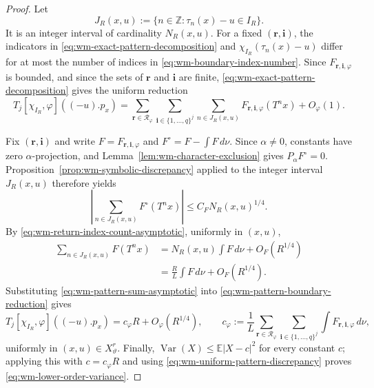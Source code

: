 \documentclass[11pt,reqno,a4paper]{amsart}
\numberwithin{equation}{section}
\theoremstyle{compact}
\theoremstyle{definition}
\theoremstyle{definition}
\newcommand{\Var}{\operatorname{Var}}
\begin{document}
\begin{proof}
Let
\begin{equation}\label{eq:wm-return-index-set}
  J_R(x,u):=\{n\in\mathbb Z:\tau_n(x)-u\in I_R\}.
\end{equation}
It is an integer interval of cardinality $N_R(x,u)$.  For a fixed
$(\mathbf r,\mathbf i)$, the indicators in
\eqref{eq:wm-exact-pattern-decomposition} and
$\chi_{I_R}(\tau_n(x)-u)$ differ for at most the number of indices in
\eqref{eq:wm-boundary-index-number}.  Since
$F_{\mathbf r,\mathbf i,\varphi}$ is bounded, and since the sets of
$\mathbf r$ and $\mathbf i$ are finite, \eqref{eq:wm-exact-pattern-decomposition}
gives the uniform reduction
\begin{equation}\label{eq:wm-pattern-boundary-reduction}
  T_j[\chi_{I_R},\varphi]((-u).p_x)
  =\sum_{\mathbf r\in\mathscr R_\varphi}
    \sum_{\mathbf i\in\{1,\ldots,q\}^j}
    \sum_{n\in J_R(x,u)}
      F_{\mathbf r,\mathbf i,\varphi}(T^nx)
    +O_\varphi(1).
\end{equation}

Fix $(\mathbf r,\mathbf i)$ and write
$F=F_{\mathbf r,\mathbf i,\varphi}$ and
$F^\circ=F-\int F\,d\nu$.  Since $\alpha\neq0$, constants have zero
$\alpha$-projection, and Lemma~\ref{lem:wm-character-exclusion} gives
$P_\alpha F^\circ=0$.  Proposition~\ref{prop:wm-symbolic-discrepancy}
applied to the integer interval $J_R(x,u)$ therefore yields
\[
  \left|\sum_{n\in J_R(x,u)}F^\circ(T^nx)\right|
  \leq C_F N_R(x,u)^{1/4}.
\]
By \eqref{eq:wm-return-index-count-asymptotic}, uniformly in $(x,u)$,
\begin{align}
  \sum_{n\in J_R(x,u)}F(T^nx)
  &=N_R(x,u)\int F\,d\nu+O_F(R^{1/4}) \\
  &=\frac RL\int F\,d\nu+O_F(R^{1/4}).
  \label{eq:wm-pattern-sum-asymptotic}
\end{align}
Substituting \eqref{eq:wm-pattern-sum-asymptotic} into
\eqref{eq:wm-pattern-boundary-reduction} gives
\begin{equation}\label{eq:wm-uniform-pattern-discrepancy}
  T_j[\chi_{I_R},\varphi]((-u).p_x)
  =c_\varphi R+O_\varphi(R^{1/4}),
  \qquad
  c_\varphi:=\frac1L
  \sum_{\mathbf r\in\mathscr R_\varphi}
  \sum_{\mathbf i\in\{1,\ldots,q\}^j}
  \int F_{\mathbf r,\mathbf i,\varphi}\,d\nu,
\end{equation}
uniformly in $(x,u)\in X_\vartheta^r$.  Finally,
$\Var(X)\leq\mathbb E|X-c|^2$ for every constant $c$; applying this with
$c=c_\varphi R$ and using \eqref{eq:wm-uniform-pattern-discrepancy} proves
\eqref{eq:wm-lower-order-variance}.
\end{proof}
\end{document}
